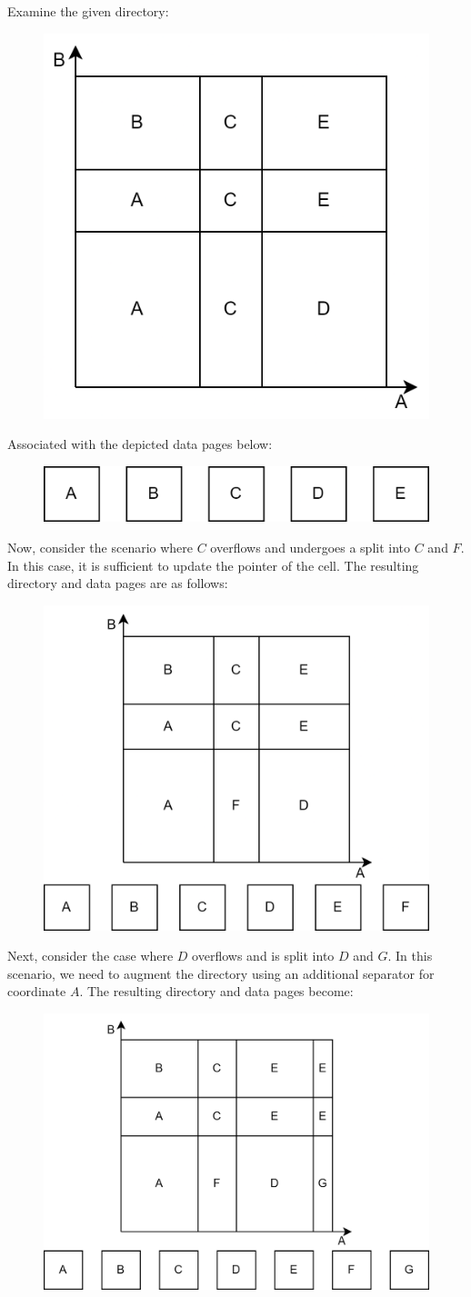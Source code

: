 \begin{example}
    Examine the given directory:
    \begin{figure}[H]
        \centering
        \includegraphics[width=0.4\linewidth]{images/grid1.png}
    \end{figure}
    Associated with the depicted data pages below:
    \begin{figure}[H]
        \centering
        \includegraphics[width=0.5\linewidth]{images/grid2.png}
    \end{figure}
    Now, consider the scenario where $C$ overflows and undergoes a split into $C$ and $F$. 
    In this case, it is sufficient to update the pointer of the cell. 
    The resulting directory and data pages are as follows:
    \begin{figure}[H]
        \centering
        \includegraphics[width=0.5\linewidth]{images/grid3.png}
    \end{figure}
    Next, consider the case where $D$ overflows and is split into $D$ and $G$. 
    In this scenario, we need to augment the directory using an additional separator for coordinate $A$. 
    The resulting directory and data pages become:
    \begin{figure}[H]
        \centering
        \includegraphics[width=0.6\linewidth]{images/grid4.png}
    \end{figure}
\end{example}

